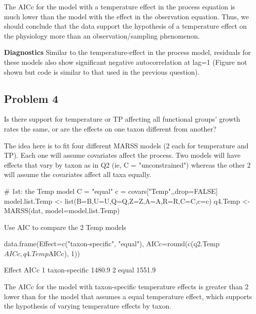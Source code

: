 The AICc for the model with a temperature effect in the process equation is
much lower than the model with the effect in the observation equation.
Thus, we should conclude that the data support the hypothesis of a temperature
effect on the physiology more than an observation/sampling phenomenon.

{\bf Diagnostics} Similar to the temperature-effect in the process model, residuals for these models also show significant negative autocorrelation at lag=1 (Figure not shown but code is similar to that used in the previous question).


\clearpage

\subsection*{Problem 4}
Is there support for temperature or TP  affecting all functional groups' growth rates the same, or are the effects on one taxon different from another?

\bigskip


The idea here is to fit four different MARSS models (2 each for temperature and TP). 
Each one will assume covariates affect the process. Two models will have
effects that vary by taxon as in Q2 (ie, C = "unconstrained") whereas
the other 2 will assume the covariates affect all taxa equally.

\begin{Schunk}
\begin{Sinput}
 # 1st: the Temp model
 C = "equal" 
 c = covars["Temp",,drop=FALSE]
 model.list.Temp <- list(B=B,U=U,Q=Q,Z=Z,A=A,R=R,C=C,c=c)
 q4.Temp <- MARSS(dat, model=model.list.Temp)
\end{Sinput}
\end{Schunk}
Use AIC to compare the 2 Temp models
\begin{Schunk}
\begin{Sinput}
 data.frame(Effect=c("taxon-specific", "equal"),
   	   AICc=round(c(q2.Temp$AICc, q4.Temp$AICc), 1))
\end{Sinput}
\begin{Soutput}
          Effect   AICc
1 taxon-specific 1480.9
2          equal 1551.9
\end{Soutput}
\end{Schunk}
The AICc for the model with taxon-specific temperature effects is greater than 2
lower than for the model that assumes a equal temperature effect, which
supports the hypothesis of varying temperature effects by taxon. 

